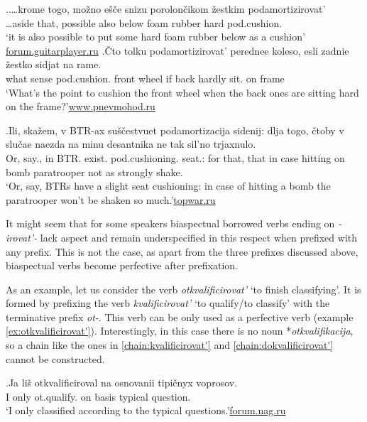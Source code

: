 \ex.\label{ex:cushion}\ag.\label{ex:cushion1}…krome togo, mo\v{z}no e\v{s}\v{c}e snizu porolon\v{c}ikom \v{z}estkim podamortizirovat'\textsuperscript{\PF}\\		
…aside that, possible also below {foam rubber} hard pod.cushion.\\
\trans `it is also possible to put some hard foam rubber below as a cushion'\\\hbox{}\hfill\hbox{\url{forum.guitarplayer.ru}}
\bg.\label{ex:cushion2}\v{C}to tolku podamortizirovat'\textsuperscript{\IPF} perednee koleso, esli zadnie \v{z}estko sidjat na rame.\\
what sense pod.cushion. front wheel if back hardly sit. on frame\\
\trans `What's the point to cushion the front wheel when the back ones are sitting hard on the frame?'\hbox{}\hfill\hbox{\url{www.pnevmohod.ru}}

\exg.\label{ex:podamortizacija}Ili, ska\v{z}em, v BTR-ax su\v{s}\v{c}estvuet podamortizacija sidenij: dlja togo, \v{c}toby v slu\v{c}ae naezda na minu desantnika ne tak sil'no trjaxnulo.\\
Or, say., in BTR. exist. pod.cushioning. seat.: for that, that in case hitting on bomb paratrooper not as strongly shake.\\
\trans `Or, say, BTRs have a slight seat cushioning: in case of hitting a bomb the paratrooper won't be shaken so much.'\hbox{}\hfill\hbox{\url{topwar.ru}}

It might seem that for some speakers biaspectual borrowed verbs ending on \textit{-irovat'-} lack aspect and remain underspecified in this respect when prefixed with any prefix. This is not the case, as apart from the three prefixes discussed above, biaspectual verbs become perfective after prefixation. 

As an example, let us consider the verb \textit{otkvalificirovat'} `to finish classifying'. It is formed by prefixing the verb \textit{kvalificirovat'} `to qualify/to classify' with the terminative prefix \textit{ot-}. This verb can be only used as a perfective verb (example \ref{ex:otkvalificirovat'}). Interestingly, in this case there is no noun *\textit{otkvalifikacija}, so a chain like the ones in \ref{chain:kvalificirovat'} and \ref{chain:dokvalificirovat'} cannot be constructed. 

\exg.\label{ex:otkvalificirovat'}Ja li\v{s} otkvalificiroval na osnovanii tipi\v{c}nyx voprosov.\\
I only ot.qualify. on basis typical question.\\
\trans `I only classified according to the typical questions.'\hbox{}\hfill\hbox{\url{forum.nag.ru}}

